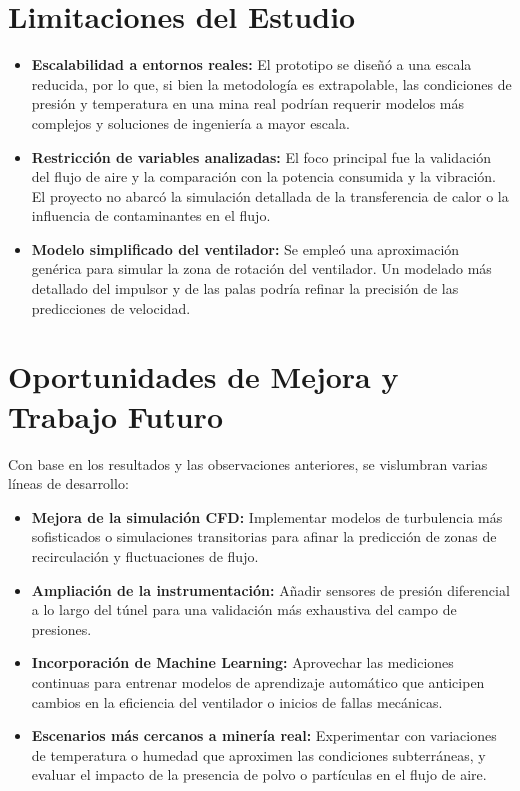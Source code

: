 \section{Limitaciones del Estudio}
\begin{itemize}
    \item \textbf{Escalabilidad a entornos reales:} El prototipo se diseñó a una escala reducida, por lo que, si bien la metodología es extrapolable, las condiciones de presión y temperatura en una mina real podrían requerir modelos más complejos y soluciones de ingeniería a mayor escala.
    \item \textbf{Restricción de variables analizadas:} El foco principal fue la validación del flujo de aire y la comparación con la potencia consumida y la vibración. El proyecto no abarcó la simulación detallada de la transferencia de calor o la influencia de contaminantes en el flujo.
    \item \textbf{Modelo simplificado del ventilador:} Se empleó una aproximación genérica para simular la zona de rotación del ventilador. Un modelado más detallado del impulsor y de las palas podría refinar la precisión de las predicciones de velocidad.
\end{itemize}

\section{Oportunidades de Mejora y Trabajo Futuro}
Con base en los resultados y las observaciones anteriores, se vislumbran varias líneas de desarrollo:
\begin{itemize}
    \item \textbf{Mejora de la simulación CFD:} Implementar modelos de turbulencia más sofisticados o simulaciones transitorias para afinar la predicción de zonas de recirculación y fluctuaciones de flujo.
    \item \textbf{Ampliación de la instrumentación:} Añadir sensores de presión diferencial a lo largo del túnel para una validación más exhaustiva del campo de presiones.
    \item \textbf{Incorporación de Machine Learning:} Aprovechar las mediciones continuas para entrenar modelos de aprendizaje automático que anticipen cambios en la eficiencia del ventilador o inicios de fallas mecánicas.
    \item \textbf{Escenarios más cercanos a minería real:} Experimentar con variaciones de temperatura o humedad que aproximen las condiciones subterráneas, y evaluar el impacto de la presencia de polvo o partículas en el flujo de aire.
\end{itemize}

